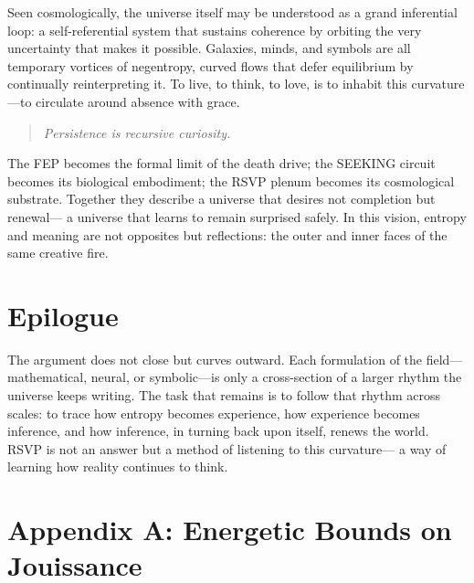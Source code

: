 \documentclass[12pt,a4paper]{article}
\begin{document}
Seen cosmologically, the universe itself may be understood as a grand inferential loop:  
a self-referential system that sustains coherence by orbiting the very uncertainty that makes it possible.  
Galaxies, minds, and symbols are all temporary vortices of negentropy,  
curved flows that defer equilibrium by continually reinterpreting it.  
To live, to think, to love, is to inhabit this curvature---to circulate around absence with grace.

\begin{quote}
\textit{Persistence is recursive curiosity.}
\end{quote}

The FEP becomes the formal limit of the death drive;  
the \textsc{SEEKING} circuit becomes its biological embodiment;  
the RSVP plenum becomes its cosmological substrate.  
Together they describe a universe that desires not completion but renewal---  
a universe that learns to remain surprised safely.  
In this vision, entropy and meaning are not opposites but reflections:  
the outer and inner faces of the same creative fire.

\section*{Epilogue}

The argument does not close but curves outward.  
Each formulation of the field—mathematical, neural, or symbolic—is only a cross-section of a larger rhythm the universe keeps writing.  
The task that remains is to follow that rhythm across scales:  
to trace how entropy becomes experience, how experience becomes inference, and how inference, in turning back upon itself, renews the world.  
RSVP is not an answer but a method of listening to this curvature—  
a way of learning how reality continues to think.



\newpage
\appendix

\section*{Appendix A: Energetic Bounds on Jouissance}
\end{document}
